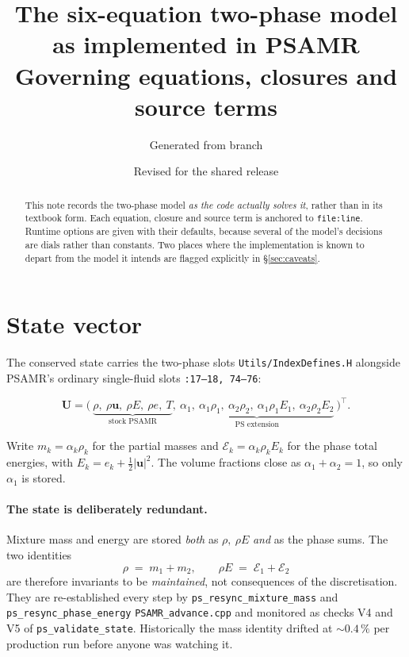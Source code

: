 \documentclass[11pt,a4paper]{article}
\title{The six-equation two-phase model as implemented in PSAMR\\
       \large Governing equations, closures and source terms}
\author{Generated from \code{PSAMR} branch \code{co2-eos}}
\date{Revised for the shared release}
\newcommand{\uvec}{\mathbf{u}}
\newcommand{\code}[1]{\texttt{\small #1}}
\newcommand{\src}[1]{{\color{gray}\code{#1}}}
\begin{document}
\maketitle

\begin{abstract}
\noindent
This note records the two-phase model \emph{as the code actually solves it},
rather than in its textbook form.  Each equation, closure and source term is
anchored to \code{file:line}.  Runtime options are given with their defaults,
because several of the model's decisions are dials rather than constants.  Two
places where the implementation is known to depart from the model it intends
are flagged explicitly in \S\ref{sec:caveats}.
\end{abstract}

\section{State vector}

The conserved state carries the two-phase slots
\src{Utils/IndexDefines.H} alongside PSAMR's ordinary single-fluid
slots \src{:17--18,~74--76}:

\begin{equation}
  \mathbf{U} =
  \bigl(\
    \underbrace{\rho,\ \rho\uvec,\ \rho E,\ \rho e,\ T}_{\text{stock PSAMR}},\
    \underbrace{\alpha_1,\ \alpha_1\rho_1,\ \alpha_2\rho_2,\
                \alpha_1\rho_1E_1,\ \alpha_2\rho_2E_2}_{\text{PS extension}}\
  \bigr)^{\!\top}.
\end{equation}

Write $m_k=\alpha_k\rho_k$ for the partial masses and
$\mathcal{E}_k=\alpha_k\rho_kE_k$ for the phase total energies, with
$E_k=e_k+\tfrac12|\uvec|^2$.  The volume fractions close as
$\alpha_1+\alpha_2=1$, so only $\alpha_1$ is stored.

\paragraph{The state is deliberately redundant.}
Mixture mass and energy are stored \emph{both} as $\rho,\ \rho E$ \emph{and}
as the phase sums.  The two identities
\begin{equation}
  \rho \;=\; m_1+m_2,
  \qquad
  \rho E \;=\; \mathcal{E}_1+\mathcal{E}_2
  \label{eq:identities}
\end{equation}
are therefore invariants to be \emph{maintained}, not consequences of the
discretisation.  They are re-established every step by
\code{ps\_resync\_mixture\_mass} and \code{ps\_resync\_phase\_energy}
\src{PSAMR\_advance.cpp} and monitored as checks V4 and V5 of
\code{ps\_validate\_state}.  Historically the mass identity drifted at
$\sim\!0.4\,\%$ per production run before anyone was watching it.
\end{document}
